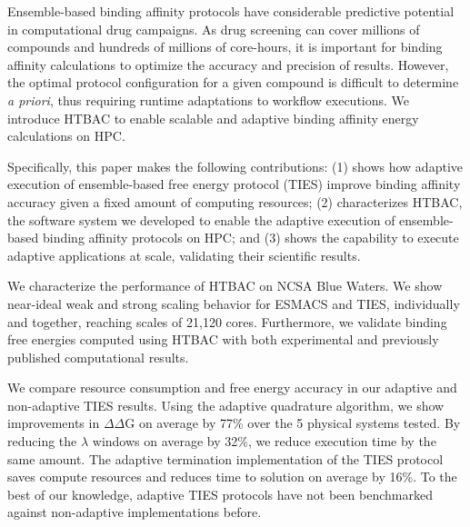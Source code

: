 Ensemble-based binding affinity protocols have considerable predictive
potential in computational drug campaigns. As drug screening can cover
millions of compounds and hundreds of millions of core-hours, it is important
for binding affinity calculations to optimize the accuracy and precision of
results. However, the optimal protocol configuration for a given compound is
difficult to determine \textit{a priori}, thus requiring runtime adaptations
to workflow executions. We introduce HTBAC to enable scalable and adaptive
binding affinity energy calculations on HPC.

Specifically, this paper makes the following contributions: (1) shows how
adaptive execution of ensemble-based free energy protocol (TIES) improve
binding affinity accuracy given a fixed amount of computing resources; (2)
characterizes HTBAC, the software system we developed to enable the adaptive
execution of ensemble-based binding affinity protocols on HPC; and (3) shows
the capability to execute adaptive applications at scale, validating their
scientific results.

We characterize the performance of HTBAC on NCSA Blue Waters. We show
near-ideal weak and strong scaling behavior for ESMACS and TIES, individually
and together, reaching scales of 21,120 cores. Furthermore, we validate
binding free energies computed using HTBAC with both experimental and
previously published computational results.

We compare resource consumption and free energy accuracy in our adaptive and
non-adaptive TIES results. Using the adaptive quadrature algorithm, we show
improvements in $\Delta \Delta$G on average by 77\% over the 5 physical
systems tested. By reducing the $\lambda$ windows on average by 32\%, we
reduce execution time by the same amount. The adaptive termination
implementation of the TIES protocol saves compute resources and reduces time
to solution on average by 16\%. To the best of our knowledge, adaptive TIES
protocols have not been benchmarked against non-adaptive implementations
before.